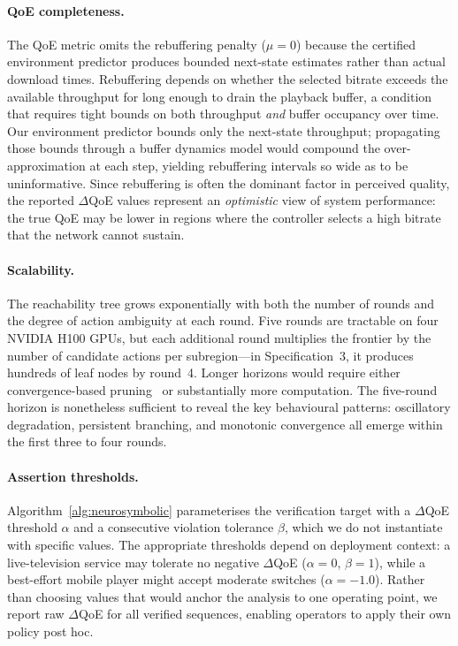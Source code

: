 \documentclass[thesis]{uofithesis} %
\begin{document}
    \paragraph{QoE completeness.}
    The QoE metric omits the rebuffering penalty ($\mu = 0$) because
    the certified environment predictor produces bounded next-state
    estimates rather than actual download times.  Rebuffering depends on
    whether the selected bitrate exceeds the available throughput for
    long enough to drain the playback buffer, a condition that requires
    tight bounds on both throughput \emph{and} buffer occupancy over
    time.  Our environment predictor bounds only the next-state
    throughput; propagating those bounds through a buffer dynamics model
    would compound the over-approximation at each step, yielding
    rebuffering intervals so wide as to be uninformative.
    Since rebuffering is often the dominant factor in perceived quality,
    the reported $\Delta$QoE values represent an \emph{optimistic} view
    of system performance: the true QoE may be lower in regions where
    the controller selects a high bitrate that the network cannot
    sustain.

    \paragraph{Scalability.}
    The reachability tree grows exponentially with both the number of
    rounds and the degree of action ambiguity at each round.  Five
    rounds are tractable on four NVIDIA H100 GPUs, but each additional
    round multiplies the frontier by the number of candidate actions per
    subregion---in Specification~3, it produces hundreds of leaf nodes by round~4.  Longer horizons would
    require either convergence-based pruning~\cite{pruning} or substantially more computation.
    The five-round horizon is nonetheless sufficient to reveal the key
    behavioural patterns: oscillatory degradation, persistent branching,
    and monotonic convergence all emerge within the first three to four
    rounds.

    \paragraph{Assertion thresholds.}
    Algorithm~\ref{alg:neurosymbolic} parameterises the verification
    target with a $\Delta$QoE threshold $\alpha$ and a consecutive
    violation tolerance $\beta$, which we do not instantiate with
    specific values.  The appropriate thresholds depend on
    deployment context: a live-television service may tolerate no
    negative $\Delta$QoE ($\alpha = 0$, $\beta = 1$), while a
    best-effort mobile player might accept moderate switches
    ($\alpha = -1.0$).  Rather than choosing values that would anchor
    the analysis to one operating point, we report raw $\Delta$QoE for
    all verified sequences, enabling operators to apply their own
    policy post hoc.
\end{document}
